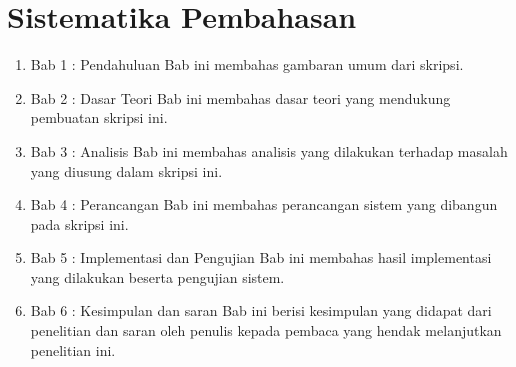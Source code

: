 \section{Sistematika Pembahasan}
\label{sec:sispem}
\begin{enumerate}
\item Bab 1 : Pendahuluan
Bab ini membahas gambaran umum dari skripsi.
\item Bab 2 : Dasar Teori
Bab ini membahas dasar teori yang mendukung pembuatan skripsi ini.
\item Bab 3 : Analisis
Bab ini membahas analisis yang dilakukan terhadap masalah yang diusung dalam skripsi ini.
\item Bab 4 : Perancangan
Bab ini membahas perancangan sistem yang dibangun pada skripsi ini.
\item Bab 5 : Implementasi dan Pengujian
Bab ini membahas hasil implementasi yang dilakukan beserta pengujian sistem.
\item Bab 6 : Kesimpulan dan saran
Bab ini berisi kesimpulan yang didapat dari penelitian dan saran oleh penulis kepada pembaca yang hendak melanjutkan penelitian ini. 
\end{enumerate}

